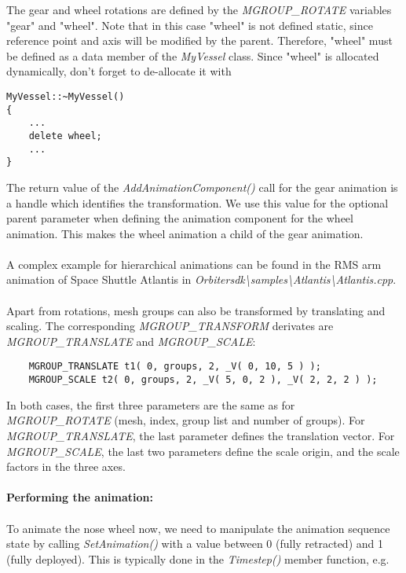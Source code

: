 \documentclass[Orbiter Developer Manual.tex]{subfiles}
\begin{document}
\noindent
The gear and wheel rotations are defined by the \textit{MGROUP\_ROTATE} variables "gear" and "wheel". Note that in this case "wheel" is not defined static, since reference point and axis will be modified by the parent. Therefore, "wheel" must be defined as a data member of the \textit{MyVessel} class. Since "wheel" is allocated dynamically, don't forget to de-allocate it with

\begin{lstlisting}
MyVessel::~MyVessel()
{
	...
	delete wheel;
	...
}
\end{lstlisting}

\noindent
The return value of the \textit{AddAnimationComponent()} call for the gear animation is a handle which identifies the transformation. We use this value for the optional parent parameter when defining the animation component for the wheel animation. This makes the wheel animation a child of the gear animation.\\
\\
A complex example for hierarchical animations can be found in the RMS arm animation of Space Shuttle Atlantis in \textit{Orbitersdk\textbackslash samples\textbackslash Atlantis\textbackslash Atlantis.cpp}.\\
\\
Apart from rotations, mesh groups can also be transformed by translating and scaling. The corresponding \textit{MGROUP\_TRANSFORM} derivates are \textit{MGROUP\_TRANSLATE} and \textit{MGROUP\_SCALE}:

\begin{lstlisting}
	MGROUP_TRANSLATE t1( 0, groups, 2, _V( 0, 10, 5 ) );
	MGROUP_SCALE t2( 0, groups, 2, _V( 5, 0, 2 ), _V( 2, 2, 2 ) );
\end{lstlisting}

\noindent
In both cases, the first three parameters are the same as for \textit{MGROUP\_ROTATE} (mesh, index, group list and number of groups). For \textit{MGROUP\_TRANSLATE}, the last parameter defines the translation vector. For \textit{MGROUP\_SCALE}, the last two parameters define the scale origin, and the scale factors in the three axes.\\
\\
\textbf{Performing the animation:}\\
\\
To animate the nose wheel now, we need to manipulate the animation sequence state by calling \textit{SetAnimation()} with a value between 0 (fully retracted) and 1 (fully deployed). This is typically done in the \textit{Timestep()} member function, e.g.
\end{document}
